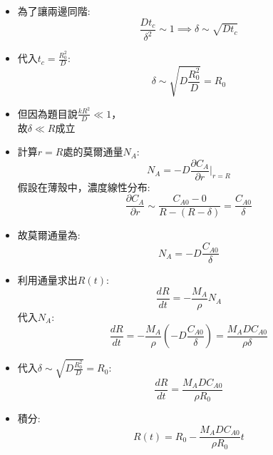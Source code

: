 \documentclass[../main.tex]{subfiles}
\begin{document}
\begin{itemize}
\begin{enumerate}
\begin{itemize}
\begin{equation}
          \frac{1}{r^{\ast 2}}\frac{\partial}{\partial r^\ast} 
          \left(
            r^{\ast 2} \frac{\partial C_A^\ast}{\partial r^\ast}
          \right)
        \right)
      \end{equation}
      \item 為了讓兩邊同階:
      \begin{equation}
        \frac{D t_c}{\delta^2} \sim 1 \implies \delta \sim \sqrt{D t_c}
      \end{equation}
      \item 代入$t_c = \frac{R_0^2}{D}$:
      \begin{equation}
        \delta \sim \sqrt{D \frac{R_0^2}{D}} = R_0
      \end{equation}
      \item 但因為題目說$\frac{kR^2}{D} \ll 1$，\\
      故$\delta \ll R$成立
      \item 計算$r=R$處的莫爾通量$N_A$:
      \begin{equation}
        N_A = -D \frac{\partial C_A}{\partial r}\Big|_{r=R}
      \end{equation}
      假設在薄殼中，濃度線性分布:
      \begin{equation}
        \frac{\partial C_A}{\partial r} \sim \frac{C_{A0} - 0}{R - (R - \delta)} = \frac{C_{A0}}{\delta}
      \end{equation}
      \item 故莫爾通量為:
      \begin{equation}
        N_A = -D \frac{C_{A0}}{\delta}
      \end{equation}
      \item 利用通量求出$R(t)$:
      \begin{equation}
        \frac{dR}{dt} = -\frac{M_A}{\rho} N_A
      \end{equation}
      代入$N_A$:
      \begin{equation}
        \frac{dR}{dt} = -\frac{M_A}{\rho} \left(
          -D \frac{C_{A0}}{\delta}
        \right) = \frac{M_A D C_{A0}}{\rho \delta}
      \end{equation}
      \item 代入$\delta \sim \sqrt{D \frac{R_0^2}{D}} = R_0$:
      \begin{equation}
        \frac{dR}{dt} = \frac{M_A D C_{A0}}{\rho R_0}
      \end{equation}
      \item 積分:
      \begin{equation}
        R(t) = R_0 - \frac{M_A D C_{A0}}{\rho R_0} t
      \end{equation}  
    \end{itemize}
  \end{enumerate}
\end{itemize}
\end{document}
